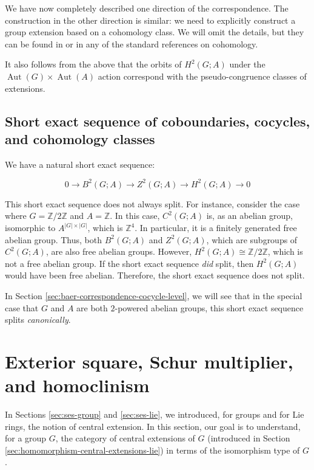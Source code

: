 \documentclass{ucetd}
\begin{document}
We have now completely described one direction of the
correspondence. The construction in the other direction is similar: we
need to explicitly construct a group extension based on a cohomology
class. We will omit the details, but they can be found in
\cite{DummitFoote} or in any of the standard references on cohomology.

It also follows from the above that the orbits of $H^2(G;A)$ under the
$\operatorname{Aut}(G) \times \operatorname{Aut}(A)$ action correspond
with the pseudo-congruence classes of extensions.

\subsection{Short exact sequence of coboundaries, cocycles, and cohomology classes}\label{sec:ses-coboundary-cocycle-cohomology}

We have a natural short exact sequence:

$$0 \to B^2(G;A) \to Z^2(G;A) \to H^2(G;A) \to 0$$

This short exact sequence does not always split. For instance,
consider the case where $G = \mathbb{Z}/2\mathbb{Z}$ and $A =
\mathbb{Z}$. In this case, $C^2(G;A)$ is, as an abelian group,
isomorphic to $A^{|G| \times |G|}$, which is $\mathbb{Z}^4$. In
particular, it is a finitely generated free abelian group. Thus, both
$B^2(G;A)$ and $Z^2(G;A)$, which are subgroups of $C^2(G;A)$, are also
free abelian groups. However, $H^2(G;A) \cong \mathbb{Z}/2\mathbb{Z}$, %
which is not a free abelian group. If the short exact sequence {\em
  did} split, then $H^2(G;A)$ would have been free abelian. Therefore,
the short exact sequence does not split.

In Section \ref{sec:baer-correspondence-cocycle-level}, we will see
that in the special case that $G$ and $A$ are both $2$-powered abelian
groups, this short exact sequence splits {\em canonically}.

\section{Exterior square, Schur multiplier, and homoclinism}\label{sec:exteriorsquare-and-homoclinism}

In Sections \ref{sec:ses-group} and \ref{sec:ses-lie}, we introduced,
for groups and for Lie rings, the notion of central extension. In this
section, our goal is to understand, for a group $G$, the category of
central extensions of $G$ (introduced in Section
\ref{sec:homomorphism-central-extensions-lie}) in terms of the
isomorphism type of $G$.
\end{document}
